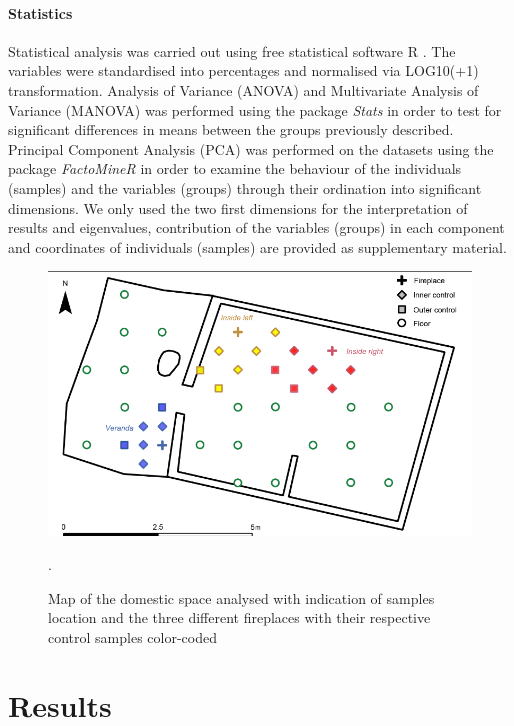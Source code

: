 \documentclass[authoryear,preprint,review,12pt]{elsarticle}
\begin{document}
\paragraph{Statistics}
Statistical analysis was carried out using free statistical software R \citep{R}. The variables were standardised into percentages and normalised via LOG10(+1) transformation.  Analysis of Variance (ANOVA) and Multivariate Analysis of Variance (MANOVA) was performed using the package \textit{Stats} \citep{R} in order to test for significant differences in means between the groups previously described. Principal Component Analysis (PCA) was performed on the datasets using the package \textit{FactoMineR} \citep{factominer} in order to examine the behaviour of the individuals (samples) and the variables (groups) through their ordination into significant dimensions. We only used the two first dimensions for the interpretation of results and eigenvalues, contribution of the variables (groups) in each component and coordinates of individuals (samples) are provided as supplementary material.

\begin{figure}[ht!]
  \begin{center}
    \includegraphics[width=15cm]{figures/figure_samples}
    \caption{Map of the domestic space analysed with indication of samples location and the three different fireplaces with their respective control samples color-coded}.
    \label{fig:samples}
  \end{center}
\end{figure}

\section{Results}
\label{sec:3}
\end{document}
